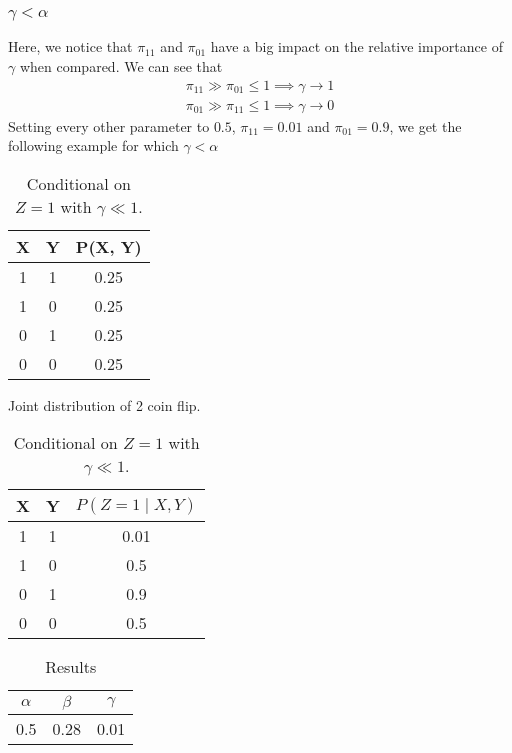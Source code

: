 \documentclass{article}
\numberwithin{equation}{section}
\begin{document}
\subsubsection{$\gamma < \alpha$}
Here, we notice that $\pi_{11}$ and $\pi_{01}$ have a big impact on the relative 
importance of $\gamma$ when compared. We can see that 
\begin{align*}
        \pi_{11} \gg \pi_{01} \leq 1 \implies  \gamma \rightarrow 1 \\
        \pi_{01} \gg \pi_{11} \leq 1 \implies  \gamma \rightarrow 0
\end{align*}
Setting every other parameter to $0.5$, $\pi_{11} = 0.01$ and $\pi_{01} = 0.9$, we get 
the following example for which $\gamma < \alpha$
\renewcommand{\arraystretch}{1}
\begin{table}[H]
\begin{minipage}{.45\textwidth}
        \centering
        
        \begin{tabular}{|c|c|c|}
                \hline
                X & Y & P(X, Y) \\  \hline
                1 & 1 & 0.25 \\\hline 
                1 & 0 & 0.25 \\\hline 
                0 & 1 & 0.25 \\\hline 
                0 & 0 & 0.25 \\\hline
        \end{tabular}
        \caption{Joint distribution of 2 coin flip.}
\end{minipage}
\begin{minipage}{.45\textwidth}
        \centering
        \begin{tabular}{|c|c|c|}
                \hline
                X & Y & $P(Z = 1 \mid X, Y)$ \\\hline
                1 & 1 & 0.01 \\\hline
                1 & 0 & 0.5 \\\hline
                0 & 1 & 0.9 \\\hline
                0 & 0 & 0.5 \\\hline
        \end{tabular}
        \caption{Conditional on $Z = 1$ with $\gamma \ll 1$.}
\end{minipage}
        \label{tab:Joint}
\end{table}

\begin{table}[H]
        \centering
        \begin{tabular}{|c|c|c|}
                \hline 
                $\alpha$ & $\beta$ & $\gamma$ \\ \hline 
                0.5 & 0.28 & 0.01 \\\hline
        \end{tabular}
        \caption{Results}
        \label{tab:Res1}
\end{table}
\end{document}
